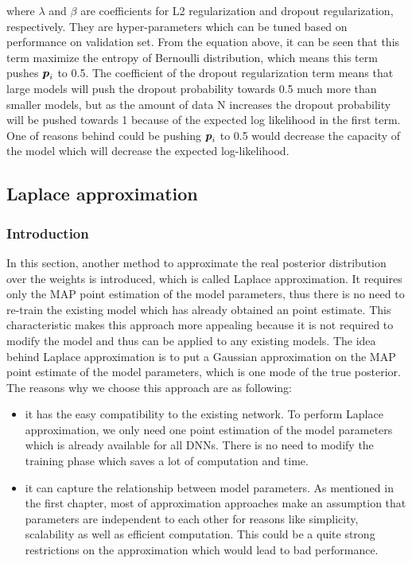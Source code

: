 where $\lambda$ and $\beta$ are coefficients for L2 regularization and dropout regularization, respectively. They are hyper-parameters which can be tuned based on performance on validation set.
From the equation above, it can be seen that this term maximize the entropy of Bernoulli distribution, which means this term pushes $\boldsymbol p_i$ to 0.5. The coefficient of the dropout regularization term means that large models will push the dropout probability towards 0.5 much more than smaller models, but as the amount of data N increases the dropout probability will be pushed towards 1 because of the expected log likelihood in the first term. One of reasons behind could be pushing $\boldsymbol p_i$ to 0.5 would decrease the capacity of the model which will decrease the expected log-likelihood. 


\subsection{Laplace approximation}
\subsubsection{Introduction}
In this section, another method to approximate the real posterior distribution over the weights is introduced, which is called Laplace approximation\cite{bishop2006pattern}. It requires only the MAP point estimation of the model parameters, thus there is no need to re-train the existing model which has already obtained an point estimate. This characteristic makes this approach more appealing  because it is not required to modify the model and thus can be applied to any existing models. The idea behind Laplace approximation is to put a Gaussian approximation on the MAP point estimate of the model parameters, which is one mode of the true posterior. The reasons why we choose this approach are as following:
\begin{itemize}
	\item it has the easy compatibility to the existing network. To perform Laplace approximation, we only need one point estimation of the model parameters which is already available for all DNNs. There is no need to modify the training phase which saves a lot of computation and time.
	\item it can capture the relationship between model parameters. As mentioned in the first chapter, most of approximation approaches make an assumption that parameters are independent to each other for reasons like simplicity, scalability as well as efficient computation. This could be a quite strong restrictions on the approximation which would lead to bad performance.
\end{itemize}

